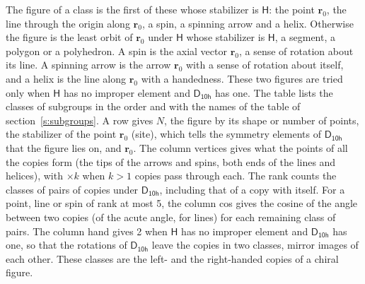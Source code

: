 \documentclass[10pt,a4paper]{article}
\numberwithin{equation}{section}
\newcommand{\grp}[1]{\mathsf{#1}}
\newcommand{\pointr}{\mathbf{r}}
\begin{document}
\leavevmode\label{n:head.figure}The figure of a class is the first of these whose stabilizer is $\grp{H}$: the point $\pointr_0$, the line through the origin along $\pointr_0$, a spin, a spinning arrow and a helix. Otherwise the figure is the least orbit of $\pointr_0$ under $\grp{H}$ whose stabilizer is $\grp{H}$, a segment, a polygon or a polyhedron. A spin is the axial vector $\pointr_0$, a sense of rotation about its line. A spinning arrow is the arrow $\pointr_0$ with a sense of rotation about itself, and a helix is the line along $\pointr_0$ with a handedness. These two figures are tried only when $\grp{H}$ has no improper element and $\grp{D_{10h}}$ has one. The table lists the classes of subgroups in the order and with the names of the table of section~\ref{s:subgroups}. \label{n:head.site}A row gives $N$, the figure by its shape or number of points, the stabilizer of the point $\pointr_0$ (site), which tells the symmetry elements of $\grp{D_{10h}}$ that the figure lies on, and $\pointr_0$. \label{n:head.vertices}The column vertices gives what the points of all the copies form (the tips of the arrows and spins, both ends of the lines and helices), with ${\times}k$ when $k > 1$ copies pass through each. \label{n:head.rank}The rank counts the classes of pairs of copies under $\grp{D_{10h}}$, including that of a copy with itself. \label{n:head.cos}For a point, line or spin of rank at most 5, the column cos gives the cosine of the angle between two copies (of the acute angle, for lines) for each remaining class of pairs. \label{n:head.hand}The column hand gives 2 when $\grp{H}$ has no improper element and $\grp{D_{10h}}$ has one, so that the rotations of $\grp{D_{10h}}$ leave the copies in two classes, mirror images of each other. These classes are the left- and the right-handed copies of a chiral figure.
\end{document}
